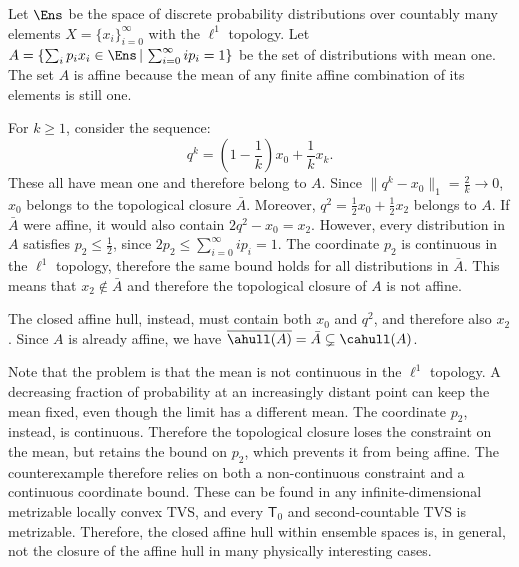 \begin{mathSection}
\begin{example}
	Let $\Ens$ be the space of discrete probability distributions over countably many elements $X = \{x_i\}_{i=0}^{\infty}$ with the $\ell^1$ topology. Let $A = \{ \sum_i p_i x_i \in \Ens \, | \, \sum_{i=0}^{\infty} i p_i = 1 \}$ be the set of distributions with mean one. The set $A$ is affine because the mean of any finite affine combination of its elements is still one.
	
	For $k \geq 1$, consider the sequence:
	$$q^{k} = \left(1-\frac{1}{k}\right)x_0 + \frac{1}{k}x_{k}.$$
	These all have mean one and therefore belong to $A$. Since $\|q^{k}-x_0\|_1 = \frac{2}{k} \to 0$, $x_0$ belongs to the topological closure $\bar{A}$. Moreover, $q^{2} = \frac{1}{2}x_0 + \frac{1}{2}x_2$ belongs to $A$. If $\bar{A}$ were affine, it would also contain $2q^{2}-x_0 = x_2$.
	However, every distribution in $A$ satisfies $p_2 \leq \frac{1}{2}$, since $2p_2 \leq \sum_{i=0}^{\infty} i p_i = 1$. The coordinate $p_2$ is continuous in the $\ell^1$ topology, therefore the same bound holds for all distributions in $\bar{A}$. This means that $x_2 \notin \bar{A}$ and therefore the topological closure of $A$ is not affine.
	
	The closed affine hull, instead, must contain both $x_0$ and $q^{2}$, and therefore also $x_2$. Since $A$ is already affine, we have $\overline{\ahull(A)} = \bar{A} \subsetneq \cahull(A)$.
\end{example}

\begin{remark}
	Note that the problem is that the mean is not continuous in the $\ell^1$ topology. A decreasing fraction of probability at an increasingly distant point can keep the mean fixed, even though the limit has a different mean. The coordinate $p_2$, instead, is continuous. Therefore the topological closure loses the constraint on the mean, but retains the bound on $p_2$, which prevents it from being affine. The counterexample therefore relies on both a non-continuous constraint and a continuous coordinate bound. These can be found in any infinite-dimensional metrizable locally convex TVS, and every $\mathsf{T}_0$ and second-countable TVS is metrizable. Therefore, the closed affine hull within ensemble spaces is, in general, not the closure of the affine hull in many physically interesting cases.
\end{remark}
\end{mathSection}

